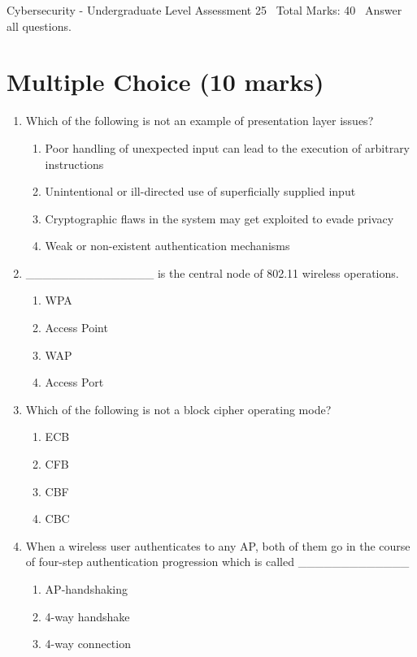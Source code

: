 \documentclass[12pt]{article}
\begin{document}
\begin{center}
Cybersecurity - Undergraduate Level Assessment 25 \
Total Marks: 40 \
Answer all questions.
\end{center}

\section*{Multiple Choice (10 marks)}
\begin{enumerate}[label=\arabic*.]
\item Which of the following is not an example of presentation layer issues?
\begin{enumerate}[label=(\alph*)]
    \item Poor handling of unexpected input can lead to the execution of arbitrary instructions
    \item Unintentional or ill-directed use of superficially supplied input
    \item Cryptographic flaws in the system may get exploited to evade privacy
    \item Weak or non-existent authentication mechanisms
\end{enumerate}
\item \_\_\_\_\_\_\_\_\_\_\_\_\_\_\_ is the central node of 802.11 wireless operations.
\begin{enumerate}[label=(\alph*)]
    \item WPA
    \item Access Point
    \item WAP
    \item Access Port
\end{enumerate}
\item Which of the following is not a block cipher operating mode?
\begin{enumerate}[label=(\alph*)]
    \item ECB
    \item CFB
    \item CBF
    \item CBC
\end{enumerate}
\item When a wireless user authenticates to any AP, both of them go in the course of four-step authentication progression which is called \_\_\_\_\_\_\_\_\_\_\_\_\_
\begin{enumerate}[label=(\alph*)]
    \item AP-handshaking
    \item 4-way handshake
    \item 4-way connection

\end{enumerate}
\end{enumerate}
\end{document}
